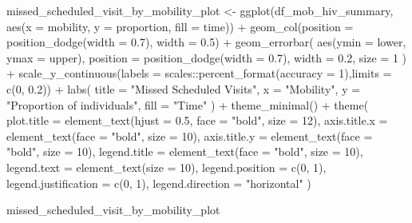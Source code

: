 \documentclass[
  letterpaper,
  DIV=11,
  numbers=noendperiod]{scrartcl}
\newenvironment{Shaded}{\begin{snugshade}}{\end{snugshade}}
\newcommand{\AttributeTok}[1]{\textcolor[rgb]{0.40,0.45,0.13}{#1}}
\newcommand{\DecValTok}[1]{\textcolor[rgb]{0.68,0.00,0.00}{#1}}
\newcommand{\FloatTok}[1]{\textcolor[rgb]{0.68,0.00,0.00}{#1}}
\newcommand{\FunctionTok}[1]{\textcolor[rgb]{0.28,0.35,0.67}{#1}}
\newcommand{\NormalTok}[1]{\textcolor[rgb]{0.00,0.23,0.31}{#1}}
\newcommand{\OtherTok}[1]{\textcolor[rgb]{0.00,0.23,0.31}{#1}}
\newcommand{\SpecialCharTok}[1]{\textcolor[rgb]{0.37,0.37,0.37}{#1}}
\newcommand{\StringTok}[1]{\textcolor[rgb]{0.13,0.47,0.30}{#1}}
\begin{document}
\begin{Shaded}
\begin{Highlighting}[]
\NormalTok{missed\_scheduled\_visit\_by\_mobility\_plot }\OtherTok{\textless{}{-}}  \FunctionTok{ggplot}\NormalTok{(df\_mob\_hiv\_summary, }\FunctionTok{aes}\NormalTok{(}\AttributeTok{x =}\NormalTok{ mobility, }\AttributeTok{y =}\NormalTok{ proportion, }\AttributeTok{fill =}\NormalTok{ time)) }\SpecialCharTok{+}
  \FunctionTok{geom\_col}\NormalTok{(}\AttributeTok{position =} \FunctionTok{position\_dodge}\NormalTok{(}\AttributeTok{width =} \FloatTok{0.7}\NormalTok{), }\AttributeTok{width =} \FloatTok{0.5}\NormalTok{) }\SpecialCharTok{+}
  \FunctionTok{geom\_errorbar}\NormalTok{(}
    \FunctionTok{aes}\NormalTok{(}\AttributeTok{ymin =}\NormalTok{ lower, }\AttributeTok{ymax =}\NormalTok{ upper),}
    \AttributeTok{position =} \FunctionTok{position\_dodge}\NormalTok{(}\AttributeTok{width =} \FloatTok{0.7}\NormalTok{),}
    \AttributeTok{width =} \FloatTok{0.2}\NormalTok{,}
    \AttributeTok{size =} \DecValTok{1}
\NormalTok{  ) }\SpecialCharTok{+}
  \FunctionTok{scale\_y\_continuous}\NormalTok{(}\AttributeTok{labels =}\NormalTok{ scales}\SpecialCharTok{::}\FunctionTok{percent\_format}\NormalTok{(}\AttributeTok{accuracy =} \DecValTok{1}\NormalTok{),}\AttributeTok{limits =} \FunctionTok{c}\NormalTok{(}\DecValTok{0}\NormalTok{, }\FloatTok{0.2}\NormalTok{)) }\SpecialCharTok{+}
  \FunctionTok{labs}\NormalTok{(}
    \AttributeTok{title =} \StringTok{"Missed Scheduled Visits"}\NormalTok{,}
    \AttributeTok{x =} \StringTok{"Mobility"}\NormalTok{,}
    \AttributeTok{y =} \StringTok{"Proportion of individuals"}\NormalTok{,}
    \AttributeTok{fill =} \StringTok{"Time"}
\NormalTok{  ) }\SpecialCharTok{+}
  \FunctionTok{theme\_minimal}\NormalTok{() }\SpecialCharTok{+}
  \FunctionTok{theme}\NormalTok{(}
    \AttributeTok{plot.title =} \FunctionTok{element\_text}\NormalTok{(}\AttributeTok{hjust =} \FloatTok{0.5}\NormalTok{, }\AttributeTok{face =} \StringTok{"bold"}\NormalTok{, }\AttributeTok{size =} \DecValTok{12}\NormalTok{),}
    \AttributeTok{axis.title.x =} \FunctionTok{element\_text}\NormalTok{(}\AttributeTok{face =} \StringTok{"bold"}\NormalTok{, }\AttributeTok{size =} \DecValTok{10}\NormalTok{),}
    \AttributeTok{axis.title.y =} \FunctionTok{element\_text}\NormalTok{(}\AttributeTok{face =} \StringTok{"bold"}\NormalTok{, }\AttributeTok{size =} \DecValTok{10}\NormalTok{),}
    \AttributeTok{legend.title =} \FunctionTok{element\_text}\NormalTok{(}\AttributeTok{face =} \StringTok{"bold"}\NormalTok{, }\AttributeTok{size =} \DecValTok{10}\NormalTok{),}
    \AttributeTok{legend.text =} \FunctionTok{element\_text}\NormalTok{(}\AttributeTok{size =} \DecValTok{10}\NormalTok{),}
    \AttributeTok{legend.position =} \FunctionTok{c}\NormalTok{(}\DecValTok{0}\NormalTok{, }\DecValTok{1}\NormalTok{),}
    \AttributeTok{legend.justification =} \FunctionTok{c}\NormalTok{(}\DecValTok{0}\NormalTok{, }\DecValTok{1}\NormalTok{),}
    \AttributeTok{legend.direction =} \StringTok{"horizontal"}
\NormalTok{  )}

\NormalTok{missed\_scheduled\_visit\_by\_mobility\_plot}
\end{Highlighting}
\end{Shaded}
\end{document}
